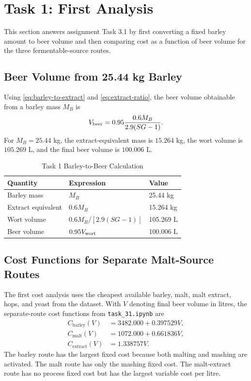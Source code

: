 \section{Task 1: First Analysis}
\label{sec:task1}
This section answers assignment Task 3.1 by first converting a fixed barley amount to beer volume and then comparing cost as a function of beer volume for the three fermentable-source routes.

\subsection{Beer Volume from 25.44 kg Barley}
\label{sec:task1-barley-volume}
Using \eqref{eq:barley-to-extract} and \eqref{eq:extract-ratio}, the beer volume obtainable from a barley mass $M_B$ is
\begin{equation}
  V_{\mathrm{beer}}
  =0.95\frac{0.6M_B}{2.9(SG-1)}.
  \label{eq:beer-from-barley-task31}
\end{equation}
For $M_B=25.44$ kg, the extract-equivalent mass is $15.264$ kg, the wort volume is $105.269$ L, and the final beer volume is $100.006$ L.

\begin{table}[!t]
\renewcommand{\arraystretch}{1.15}
\caption{Task 1 Barley-to-Beer Calculation}
\label{tab:task31-barley}
\centering
\small
\begin{tabular}{@{}lll@{}}
\toprule
Quantity & Expression & Value \\
\midrule
Barley mass & $M_B$ & 25.44 kg \\
Extract equivalent & $0.6M_B$ & 15.264 kg \\
Wort volume & $0.6M_B/[2.9(SG-1)]$ & 105.269 L \\
Beer volume & $0.95V_{\mathrm{wort}}$ & 100.006 L \\
\bottomrule
\end{tabular}
\end{table}

\subsection{Cost Functions for Separate Malt-Source Routes}
\label{sec:task1-cost-functions}
The first cost analysis uses the cheapest available barley, malt, malt extract, hops, and yeast from the dataset. With $V$ denoting final beer volume in litres, the separate-route cost functions from \texttt{task\_31.ipynb} are
\begin{align}
  C_{\mathrm{barley}}(V) &= 3482.000 + 0.397529V,\\
  C_{\mathrm{malt}}(V) &= 1072.000 + 0.661836V,\\
  C_{\mathrm{extract}}(V) &= 1.338757V.
\end{align}
The barley route has the largest fixed cost because both malting and mashing are activated. The malt route has only the mashing fixed cost. The malt-extract route has no process fixed cost but has the largest variable cost per litre.

